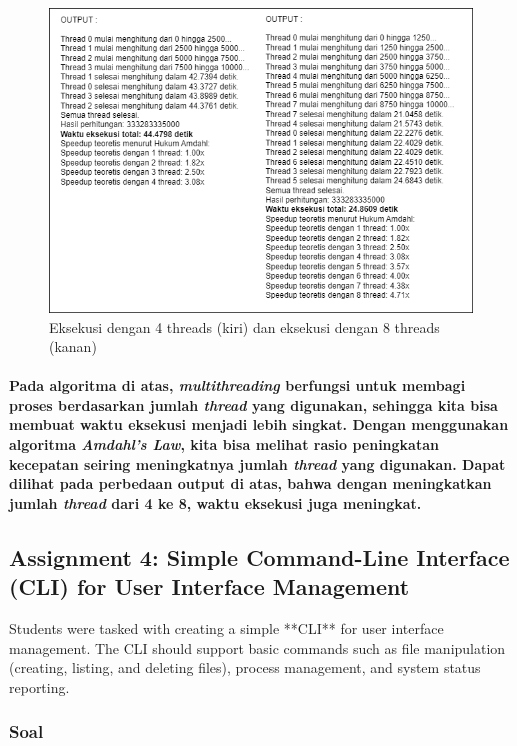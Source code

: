 \documentclass[12pt]{article}
\begin{document}
\begin{figure}[H]
    \centering
    \includegraphics[width=1\linewidth]{asset/31.png}
    \caption{Eksekusi dengan 4 threads (kiri) dan eksekusi dengan 8 threads (kanan)}
\end{figure}

\paragraph{
    \hspace*{1cm} Pada algoritma di atas, \textit{multithreading} berfungsi untuk membagi proses berdasarkan jumlah \textit{thread} yang digunakan, sehingga kita bisa membuat waktu eksekusi menjadi lebih singkat. Dengan menggunakan algoritma \textit{Amdahl's Law}, kita bisa melihat rasio peningkatan kecepatan seiring meningkatnya jumlah \textit{thread} yang digunakan. Dapat dilihat pada perbedaan output di atas, bahwa dengan meningkatkan jumlah \textit{thread} dari 4 ke 8, waktu eksekusi juga meningkat.
}



\subsection{Assignment 4: Simple Command-Line Interface (CLI) for User Interface Management}
Students were tasked with creating a simple **CLI** for user interface management. The CLI should support basic commands such as file manipulation (creating, listing, and deleting files), process management, and system status reporting.

\subsubsection{Soal}
\end{document}
